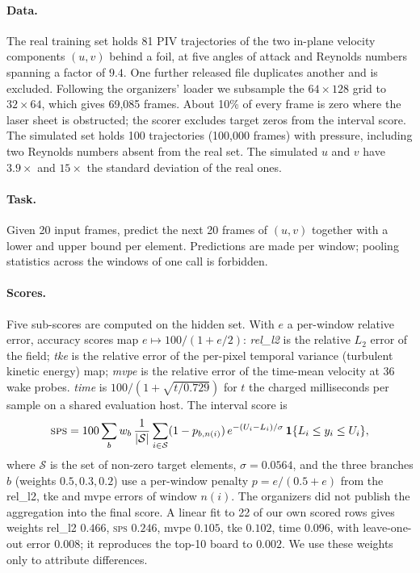 \documentclass[10pt]{article}
\newcommand{\sps}{\textsc{sps}}
\begin{document}
\paragraph{Data.} The real training set holds 81 PIV trajectories of the two in-plane velocity components $(u,v)$ behind a foil, at five angles of attack and Reynolds numbers spanning a factor of $9.4$. One further released file duplicates another and is excluded. Following the organizers' loader we subsample the $64\times128$ grid to $32\times64$, which gives 69,085 frames. About 10\% of every frame is zero where the laser sheet is obstructed; the scorer excludes target zeros from the interval score. The simulated set holds 100 trajectories (100,000 frames) with pressure, including two Reynolds numbers absent from the real set. The simulated $u$ and $v$ have $3.9\times$ and $15\times$ the standard deviation of the real ones.

\paragraph{Task.} Given 20 input frames, predict the next 20 frames of $(u,v)$ together with a lower and upper bound per element. Predictions are made per window; pooling statistics across the windows of one call is forbidden.

\paragraph{Scores.} Five sub-scores are computed on the hidden set. With $e$ a per-window relative error, accuracy scores map $e\mapsto 100/(1+e/2)$: \emph{rel\_l2} is the relative $L_2$ error of the field; \emph{tke} is the relative error of the per-pixel temporal variance (turbulent kinetic energy) map; \emph{mvpe} is the relative error of the time-mean velocity at 36 wake probes. \emph{time} is $100/(1+\sqrt{t/0.729})$ for $t$ the charged milliseconds per sample on a shared evaluation host. The interval score is
\begin{equation}
\sps = 100\sum_{b} w_b\,\frac{1}{|\mathcal{S}|}\sum_{i\in\mathcal{S}} (1-p_{b,n(i)})\, e^{-(U_i-L_i)/\sigma}\,\mathbf{1}\{L_i\le y_i\le U_i\},
\label{eq:sps}
\end{equation}
where $\mathcal{S}$ is the set of non-zero target elements, $\sigma=0.0564$, and the three branches $b$ (weights $0.5,0.3,0.2$) use a per-window penalty $p=e/(0.5+e)$ from the rel\_l2, tke and mvpe errors of window $n(i)$. The organizers did not publish the aggregation into the final score. A linear fit to 22 of our own scored rows gives weights rel\_l2 $0.466$, \sps{} $0.246$, mvpe $0.105$, tke $0.102$, time $0.096$, with leave-one-out error $0.008$; it reproduces the top-10 board to $0.002$. We use these weights only to attribute differences.
\end{document}
